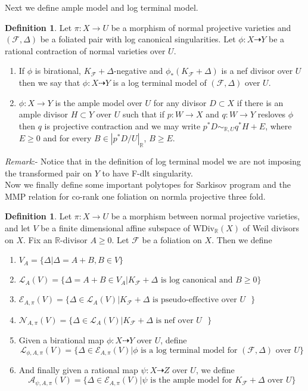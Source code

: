 \documentclass[12pt]{amsart}%
\theoremstyle{plain}
\theoremstyle{remark}
\theoremstyle{definition}
\newcommand{\<}{\leq}
\newcommand{\mbR}{\mathbb{R}}
\theoremstyle{definition}
\newtheorem{definition}[theorem]{Definition}
\theoremstyle{definition}
\numberwithin{equation}{section}
\theoremstyle{remark}
\begin{document}
Next we define ample model and log terminal model.
\begin{definition}
    Let $\pi:X\rightarrow U$ be a morphism of normal projective varieties and $(\mathcal{F},\Delta)$ be a foliated pair with log canonical singularities. Let $\phi:X\dashrightarrow Y$ be a rational contraction of normal varieties over $U$.
    \begin{enumerate}
        \item If $\phi$ is birational, $K_{\mathcal{F}}+\Delta$-negative and $\phi_*(K_{\mathcal{F}}+\Delta)$ is a nef divisor over $U$ then we say that $\phi:X\dashrightarrow Y$ is a log terminal model of $(\mathcal{F},\Delta)$ over $U$.
        \item $\phi:X\rightarrow Y$ is the ample model over $U$ for any divisor $D\subset X$ if there is an ample divisor $H\subset Y$ over $U$ such that if $p:W\rightarrow X$ and $q:W\rightarrow Y$ resloves $\phi$ then $q$ is projective contraction and we may write $p^*D\sim_{\mbR,U}q^* H+E$, where $E\geqslant 0$ and for every $B\in|p^*D/U|_{\mbR}$, $B\geqslant E$.
    \end{enumerate}
\end{definition}
\textit{Remark}:- Notice that in the definition of log terminal model we are not imposing the transformed pair on $Y$ to have F-dlt singularity.\\
Now we finally define some important polytopes for Sarkisov program and the MMP relation for co-rank one foliation on normla projective three fold.
\begin{definition}
    Let $\pi:X\rightarrow U$ be a morphism between normal projective varieties, and let $V$ be a finite dimensional affine subspace of $\text{WDiv}_{\mbR}(X)$ of Weil divisors on $X$. Fix an $\mbR$-divisor $A\geqslant 0$. Let $\mathcal{F}$ be a foliation on $X$. Then we define
    \begin{enumerate}
        \item $V_A=\lbrace \Delta|\Delta=A+B, B\in V\rbrace$
        \item $\mathcal{L}_A(V)=\lbrace \Delta=A+B\in V_A|K_{\mathcal{F}}+\Delta \text{ is log canonical and } B\geqslant 0\rbrace$
        \item $\mathcal{E}_{A,\pi}(V)=\lbrace \Delta\in \mathcal{L}_A(V)|K_{\mathcal{F}}+\Delta\text{ is pseudo-effective over $U$ }\rbrace$
        \item $\mathcal{N}_{A,\pi}(V)=\lbrace \Delta\in \mathcal{L}_{A}(V)|K_{\mathcal{F}}+\Delta \text{ is nef over $U$ }\rbrace$
        \item Given a birational map $\phi:X\dashrightarrow Y$ over $U$, define \[ 
        \mathcal{L}_{\phi,A,\pi}(V)=\lbrace \Delta\in \mathcal{E}_{A,\pi}(V)| \phi \text{ is a log terminal model for $(\mathcal{F},\Delta)$ over $U$}\rbrace\]
        \item And finally given a rational map $\psi:X\dashrightarrow Z$ over $U$, we define
        \[
        \mathcal{A}_{\psi,A,\pi}(V)=\lbrace \Delta\in \mathcal{E}_{A,\pi}(V)| \psi \text{ is the ample model for $K_{\mathcal{F}}+\Delta$ over $U$}\rbrace
        \]
        
    \end{enumerate}
\end{definition}
\end{document}
